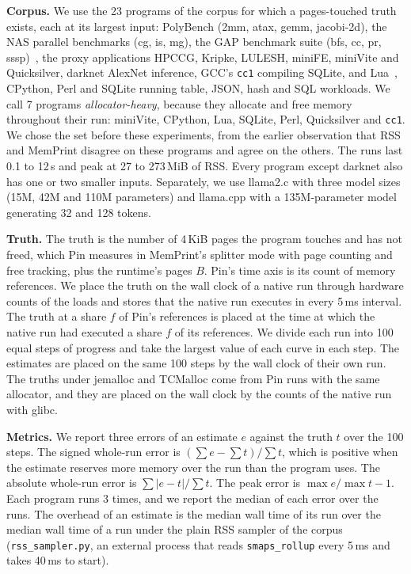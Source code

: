 \documentclass[11pt]{article}
\newcommand{\memprint}{MemPrint}
\newcommand{\term}[1]{\emph{#1}}
\begin{document}
\textbf{Corpus.} We use the 23 programs of the corpus for which a pages-touched truth exists, each at its largest
input: PolyBench (2mm, atax, gemm, jacobi-2d), the NAS parallel benchmarks (cg, is, mg), the GAP benchmark suite (bfs,
cc, pr, sssp)~\cite{beamer2015gap}, the proxy applications HPCCG, Kripke, LULESH, miniFE, miniVite and Quicksilver,
darknet AlexNet inference, GCC's \texttt{cc1} compiling SQLite, and Lua~\cite{ierusalimschy1996lua}, CPython, Perl and
SQLite running table, JSON, hash and SQL workloads. We call 7 programs \term{allocator-heavy}, because they allocate
and free memory throughout their run: miniVite, CPython, Lua, SQLite, Perl, Quicksilver and \texttt{cc1}. We chose the
set before these experiments, from the earlier observation that RSS and \memprint{} disagree on these programs and
agree on the others. The runs last 0.1 to 12\,s and peak at 27 to 273\,MiB of RSS. Every program except darknet also
has one or two smaller inputs. Separately, we use llama2.c with three model sizes (15M, 42M and 110M parameters) and
llama.cpp with a 135M-parameter model generating 32 and 128 tokens.

\textbf{Truth.} The truth is the number of 4\,KiB pages the program touches and has not freed, which Pin measures in
\memprint{}'s splitter mode with page counting and free tracking, plus the runtime's pages $B$. Pin's time axis is
its count of memory references. We place the truth on the wall clock of a native run through hardware counts of the
loads and stores that the native run executes in every 5\,ms interval. The truth at a share $f$ of Pin's references is
placed at the time at which the native run had executed a share $f$ of its references. We divide each run into 100
equal steps of progress and take the largest value of each curve in each step. The estimates are placed on the same
100 steps by the wall clock of their own run. The truths under jemalloc and TCMalloc come from Pin runs with the same
allocator, and they are placed on the wall clock by the counts of the native run with glibc.

\textbf{Metrics.} We report three errors of an estimate $e$ against the truth $t$ over the 100 steps. The signed
whole-run error is $(\sum e - \sum t)/\sum t$, which is positive when the estimate reserves more memory over the run
than the program uses. The absolute whole-run error is $\sum |e - t| / \sum t$. The peak error is $\max e / \max t -
1$. Each program runs 3 times, and we report the median of each error over the runs. The overhead of an estimate is
the median wall time of its run over the median wall time of a run under the plain RSS sampler of the corpus
(\texttt{rss\_sampler.py}, an external process that reads \texttt{smaps\_rollup} every 5\,ms and takes 40\,ms to
start).
\end{document}
